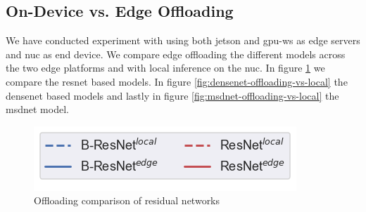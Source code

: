 \subsection{On-Device vs. Edge Offloading}

We have conducted experiment with using both \gls{jetson} and \gls{gpu-ws} as edge servers and \gls{nuc} as end device. We compare edge offloading the different models across the two edge platforms and with local inference on the \gls{nuc}. In figure \ref{fig:resnet-offloading-vs-local} we compare the \gls{resnet} based models. In figure \ref{fig:densenet-offloading-vs-local} the \gls{densenet} based models and lastly in figure \ref{fig:msdnet-offloading-vs-local} the \gls{msdnet} model.

\begin{figure}
	\captionsetup[subfigure]{justification=centering, farskip=0pt,captionskip=0pt}
	\centering
	\includegraphics[width=.3\linewidth]{figures/edge/gpu_b-resnet_offloading_vs_local_legend}
	\hfill
	\hfill
	\caption[Offloading comparison of residual networks]{Offloading comparison of residual networks}
	\label{fig:resnet-offloading-vs-local}
\end{figure}

